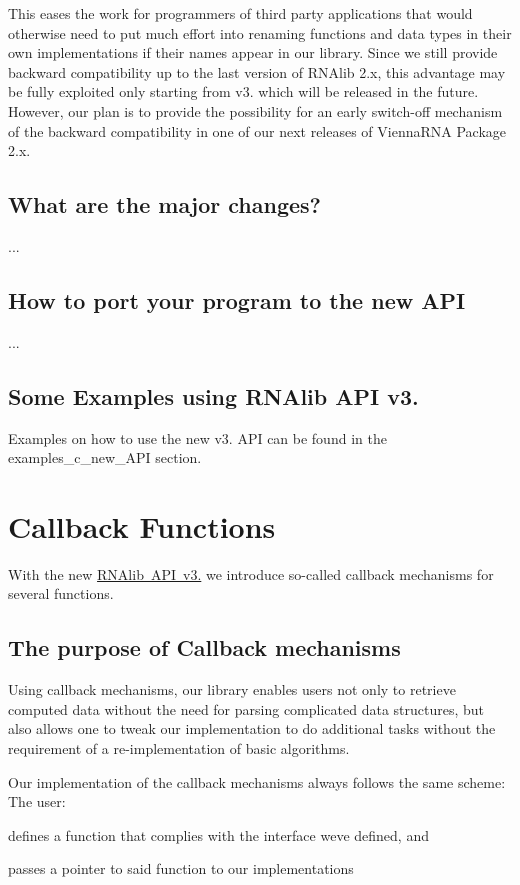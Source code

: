 This eases the work for programmers of third party applications that would otherwise need to put much effort into renaming functions and data types in their own implementations if their names appear in our library. Since we still provide backward compatibility up to the last version of R\+N\+Alib 2.\+x, this advantage may be fully exploited only starting from v3. which will be released in the future. However, our plan is to provide the possibility for an early switch-\/off mechanism of the backward compatibility in one of our next releases of Vienna\+R\+NA Package 2.\+x.\hypertarget{new_a_p_i_newAPI_changes}{}\subsection{What are the major changes?}\label{new_a_p_i_newAPI_changes}
...\hypertarget{new_a_p_i_newAPI_porting}{}\subsection{How to port your program to the new A\+PI}\label{new_a_p_i_newAPI_porting}
...\hypertarget{new_a_p_i_newAPI_examples}{}\subsection{Some Examples using R\+N\+Alib A\+P\+I v3.}\label{new_a_p_i_newAPI_examples}
Examples on how to use the new v3. A\+PI can be found in the examples\+\_\+c\+\_\+new\+\_\+\+A\+PI section. \hypertarget{callbacks}{}\section{Callback Functions}\label{callbacks}
With the new \mbox{\hyperlink{newAPI}{R\+N\+Alib A\+PI v3.}} we introduce so-\/called callback mechanisms for several functions.\hypertarget{callbacks_callbacks_intro}{}\subsection{The purpose of Callback mechanisms}\label{callbacks_callbacks_intro}
Using callback mechanisms, our library enables users not only to retrieve computed data without the need for parsing complicated data structures, but also allows one to tweak our implementation to do additional tasks without the requirement of a re-\/implementation of basic algorithms.

Our implementation of the callback mechanisms always follows the same scheme\+: The user\+:
\begin{DoxyItemize}
\item defines a function that complies with the interface we\textquotesingle{}ve defined, and
\item passes a pointer to said function to our implementations
\end{DoxyItemize}

